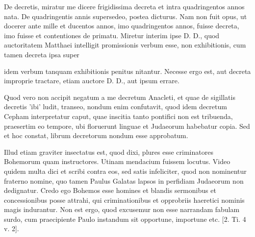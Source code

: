 De decretis, miratur me dicere frigidissima decreta et intra quadringentos annos nata. De quadringentis annis supersedeo, postea dicturus. Nam non fuit opus, ut docerer ante mille et ducentos annos, imo quadringentos annos, fuisse decreta, imo fuisse et contentiones de primatu. Miretur interim ipse D. D., quod auctoritatem Matthaei intelligit promissionis verbum esse, non exhibitionis, cum tamen decreta ipsa super

idem verbum tanquam exhibitionis penitus nitantur. Necesse ergo est, aut decreta improprie tractare, etiam auctore D. D., aut ipsum errare.

Quod vero non accipit negatum a me decretum Anacleti, et quae de sigillatis decretis 'ibi' ludit, transeo, nondum enim confutavit, quod idem decretum Cepham interpretatur caput, quae inscitia tanto pontifici non est tribuenda, praesertim eo tempore, ubi floruerunt linguae et Judaeorum habebatur copia. Sed et hoc constat, librum decretorum nondum esse approbatum.

Illud etiam graviter insectatus est, quod dixi, plures esse criminatores Bohemorum quam instructores. Utinam mendacium fuissem locutus. Video quidem multa dici et scribi contra eos, sed satis infeliciter, quod non nominentur fraterno nomine, quo tamen Paulus Galatas lapsos in perfidiam Judaeorum non dedignatur. Credo ego Bohemos esse homines et blandis sermonibus et concessionibus posse attrahi, qui criminationibus et opprobriis haeretici nominis magis indurantur. Non est ergo, quod excusemur non esse narrandam fabulam surdo, cum praecipiente Paulo instandum sit opportune, importune etc. [2. Ti. 4 v. 2].

